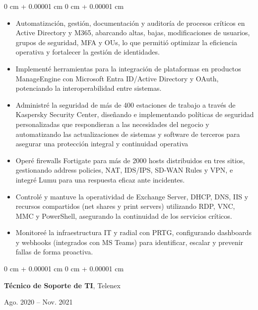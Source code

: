 \documentclass[10pt, letterpaper]{article}
\newenvironment{highlights}{
    \begin{itemize}[
        topsep=0.10 cm,
        parsep=0.10 cm,
        partopsep=0pt,
        itemsep=0pt,
        leftmargin=0 cm + 10pt
    ]
}{
    \end{itemize}
} %
\newenvironment{onecolentry}{
    \begin{adjustwidth}{
        0 cm + 0.00001 cm
    }{
        0 cm + 0.00001 cm
    }
}{
    \end{adjustwidth}
} %
\newenvironment{twocolentry}[2][]{
    \onecolentry
    \def\secondColumn{#2}
    \setcolumnwidth{\fill, 4.5 cm}
    \begin{paracol}{2}
}{
    \switchcolumn \raggedleft \secondColumn
    \end{paracol}
    \endonecolentry
} %
\begin{document}
\vspace{0.10 cm}
\begin{onecolentry}
    \begin{highlights}
        \item Automatización, gestión, documentación y auditoría de procesos críticos en Active Directory y M365, abarcando altas, bajas, modificaciones de usuarios, grupos de seguridad, MFA y OUs, lo que permitió optimizar la eficiencia operativa y fortalecer la gestión de identidades.
        \item Implementé herramientas para la integración de plataformas en productos ManageEngine con Microsoft Entra ID/Active Directory y OAuth, potenciando la interoperabilidad entre sistemas.
        \item Administré la seguridad de más de 400 estaciones de trabajo a través de Kaspersky Security Center, diseñando e implementando políticas de seguridad personalizadas que respondieran a las necesidades del negocio y automatizando las actualizaciones de sistemas y software de terceros para asegurar una protección integral y continuidad operativa
        \item Operé firewalls Fortigate para más de 2000 hosts distribuidos en tres sitios, gestionando address policies, NAT, IDS/IPS, SD-WAN Rules y VPN, e integré Lumu para una respuesta eficaz ante incidentes.
        \item Controlé y mantuve la operatividad de Exchange Server, DHCP, DNS, IIS y recursos compartidos (net shares y print servers) utilizando RDP, VNC, MMC y PowerShell, asegurando la continuidad de los servicios críticos.
        \item Monitoreé la infraestructura IT y radial con PRTG, configurando dashboards y webhooks (integrados con MS Teams) para identificar, escalar y prevenir fallas de forma proactiva.
    \end{highlights}
\end{onecolentry}

\vspace{0.2 cm}

\begin{twocolentry}{
    Ago. 2020 – Nov. 2021
}
    \textbf{Técnico de Soporte de TI}, Telenex
\end{twocolentry}
\end{document}

